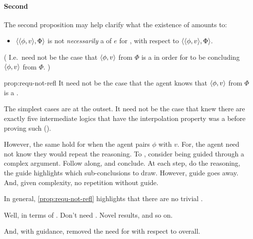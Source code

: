 \paragraph*{Second}

\begin{note}
  The second proposition may help clarify what the existence of  amounts to:

  \begin{proposition}
    \label{prop:requ-not-refl}

    \begin{itemize}
    \item
      \(\langle \langle \phi, v \rangle, \Phi \rangle\) is not \emph{necessarily} a \requ{} of \(e\) for \vAgent{}, with respect to \(\langle \langle \phi, v \rangle, \Phi \rangle\).
    \end{itemize}

    (%
    I.e.\ need not be the case that \(\langle \phi, v \rangle\) from \(\Phi\) is a \fc{} in order for \vAgent{} to be concluding \(\langle \phi, v \rangle\) from \(\Phi\).%
    )
  \end{proposition}
  \begin{argument}{prop:requ-not-refl}
    It need not be the case that the agent knows that \(\langle \phi, v \rangle\) from \(\Phi\) is a \fc{}.

    The simplest cases are at the outset.
    It need not be the case that \citeauthor{Maksimova:1977un} knew there are exactly five intermediate logics that have the interpolation property was a \fc{} before proving such (\cite[cf.][]{Maksimova:1977un}).

    However, the same hold for when the agent pairs \(\phi\) with \(v\).
    For, the agent need not know they would repeat the reasoning.
    To , consider being guided through a complex argument.
    Follow along, and conclude.
    At each step, do the reasoning, the guide highlights which sub-conclusions to draw.
    However, guide goes away.
    And, given complexity, no repetition without guide.
  \end{argument}

  In general, \autoref{prop:requ-not-refl} highlights that there are no trivial .

  Well, in terms of \sR{}.
  Don't need \sR{}.
  Novel results, and so on.

  And, with guidance, removed the need for \sR{} with respect to overall.
\end{note}

